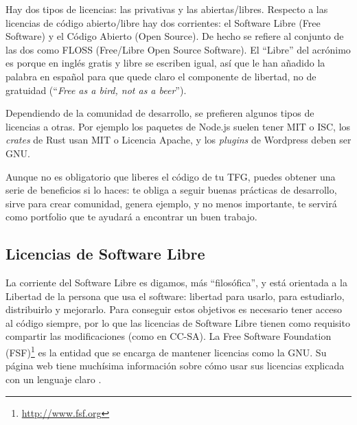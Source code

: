 Hay dos tipos de licencias: las privativas y las abiertas/libres. Respecto a las licencias de código abierto/libre hay dos corrientes: el Software Libre (Free Software) y el Código Abierto (Open Source). De hecho se refiere al conjunto de las dos como FLOSS (Free/Libre Open Source Software). El ``Libre'' del acrónimo es porque en inglés gratis y libre se escriben igual, así que le han añadido la palabra en español para que quede claro el componente de libertad, no de gratuidad (``\textit{Free as a bird, not as a beer}'').

Dependiendo de la comunidad de desarrollo, se prefieren algunos tipos de licencias a otras. Por ejemplo los paquetes de Node.js suelen tener MIT o ISC, los \textit{crates} de Rust usan MIT o Licencia Apache, y los \textit{plugins} de Wordpress deben ser GNU.

Aunque no es obligatorio que liberes el código de tu TFG, puedes obtener una serie de beneficios si lo haces: te obliga a seguir buenas prácticas de desarrollo, sirve para crear comunidad, genera ejemplo, y no menos importante, te servirá como portfolio que te ayudará a encontrar un buen trabajo.

\subsection{Licencias de Software Libre}
La corriente del Software Libre es digamos, más ``filosófica'', y está orientada a la Libertad de la persona que usa el software: libertad para usarlo, para estudiarlo, distribuirlo y mejorarlo. Para conseguir estos objetivos es necesario tener acceso al código siempre, por lo que las licencias de Software Libre tienen como requisito compartir las modificaciones (como en CC-SA). La Free Software Foundation (FSF)\footnote{\url{http://www.fsf.org}} es la entidad que se encarga de mantener licencias como la GNU. Su página web tiene muchísima información sobre cómo usar sus licencias explicada con un lenguaje claro \cite{FSFfaq}.

